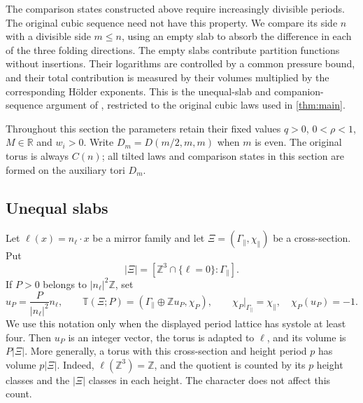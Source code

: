 \documentclass[11pt,letterpaper,reqno]{amsart}
\newcommand{\R}{\mathbb R}
\newcommand{\Z}{\mathbb Z}
\begin{document}
The comparison states constructed above require increasingly divisible
periods. The original cubic sequence need not have this property.
We compare its side $n$ with a divisible side $m\le n$, using an
empty slab to absorb the difference in each of the three folding
directions. The empty slabs contribute partition functions without
insertions. Their logarithms are controlled by a common pressure
bound, and their total contribution is measured by their volumes
multiplied by the corresponding H\"older exponents. This is the
unequal-slab and companion-sequence argument of
\cite[Sections~11.1--11.5]{ChamberQED}, restricted to the original
cubic laws used in \cref{thm:main}.

Throughout this section the parameters retain their fixed values
$q>0$, $0<\rho<1$, $M\in\R$ and $w_i>0$. Write
$D_m=D(m/2,m,m)$ when $m$ is even. The original torus is always
$C(n)$; all tilted laws and comparison states in this section are
formed on the auxiliary tori $D_m$.

\subsection{Unequal slabs}\label{sec:unequal-heights}

Let $\ell(x)=n_\ell\cdot x$ be a mirror family and let
$\Xi=(\Gamma_\parallel,\chi_\parallel)$ be a cross-section. Put
\[
 |\Xi|=[\Z^3\cap\{\ell=0\}:\Gamma_\parallel].
\]
If $P>0$ belongs to $|n_\ell|^2\Z$, set
\[
 u_P=\frac{P}{|n_\ell|^2}n_\ell,\qquad
 \mathbb T(\Xi;P)=
   (\Gamma_\parallel\oplus\Z u_P,\chi_P),
 \qquad \chi_P|_{\Gamma_\parallel}=\chi_\parallel,
 \quad\chi_P(u_P)=-1.
\]
We use this notation only when the displayed period lattice has systole
at least four. Then $u_P$ is an integer vector, the torus is adapted
to $\ell$, and its volume is $P|\Xi|$. More generally, a torus with
this cross-section and height period $p$ has volume $p|\Xi|$.
Indeed, $\ell(\Z^3)=\Z$, and the quotient is counted by its $p$
height classes and the $|\Xi|$ classes in each height. The character
does not affect this count.
\end{document}
